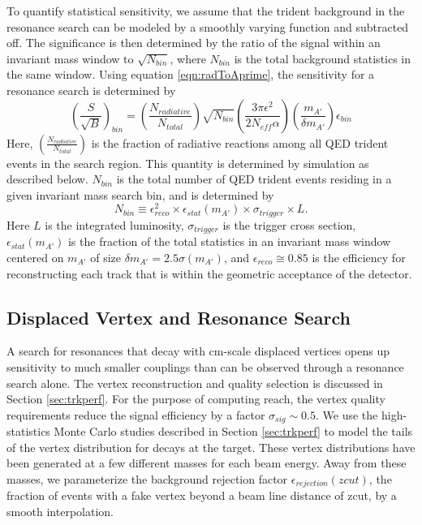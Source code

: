 To quantify statistical sensitivity, we assume that the trident background in the 
resonance search can be modeled by a smoothly varying function and subtracted off. 
The significance is then determined by the ratio of the signal within an invariant mass 
window to $\sqrt{N_{bin}}$, where $N_{bin}$ is the total background statistics in the 
same window. Using equation \ref{eqn:radToAprime}, the sensitivity for a resonance search is determined by
\begin{equation}
 \left({\frac{S} {\sqrt{B}}}\right)_{bin}=\left({\frac{N_{radiative}} {N_{total}}}\right) \sqrt{N_{bin}} 
\left({\frac{3\pi \epsilon^2} {2 N_{eff}\alpha}}\right)\left({\frac{m_{A'}} {\delta m_{A'}}}\right)
\epsilon_{bin}
\label{eqn:signifBumpHunt}
\end{equation}   
Here, $\left({\frac{N_{radiative}} {N_{total}}}\right)$ is the fraction of radiative reactions 
among all QED trident events in the search region. This quantity is determined by 
simulation as described below. $N_{bin}$ is the total number of QED trident events 
residing in a given invariant mass search bin, and is determined by
\begin{equation}
 N_{bin} \equiv \epsilon_{reco}^2 \times \epsilon_{stat}(m_{A'})
 \times \sigma_{trigger} \times L.
\end{equation}
Here $L$ is the integrated luminosity, $\sigma_{trigger}$ is the trigger cross section, 
$\epsilon_{stat} (m_{A'})$ is the fraction of the total statistics in an invariant 
mass window centered on $m_{A'}$ of size  $\delta m_{A'} =2.5 \sigma (m_{A'})$, 
and $\epsilon_{reco} \cong 0.85$ is the efficiency for reconstructing each track that is 
within the geometric acceptance of the detector. 

\subsection{ Displaced Vertex and Resonance Search}

A search for resonances that decay with cm-scale displaced vertices opens up sensitivity 
to much smaller couplings than can be observed through a resonance search alone.  
The vertex reconstruction and quality selection is discussed in Section \ref{sec:trkperf}.   
For the purpose of computing reach, the vertex quality requirements 
reduce the signal efficiency by a factor  $\sigma_{sig}\sim 0.5$.  
We use the high-statistics Monte Carlo studies described in 
Section \ref{sec:trkperf} to model the tails of the vertex distribution for decays at the target.  
These vertex distributions have been generated at a few different masses for each beam energy. 
Away from  these masses, we parameterize the background rejection factor $\epsilon_{rejection} (zcut)$,
 the fraction of events with a fake vertex beyond a beam line distance of zcut, 
by a smooth interpolation.

